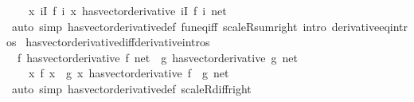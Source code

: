 \begin{isabellebody}
\ \ \ \ {\isacharparenleft}{\kern0pt}{\isacharparenleft}{\kern0pt}{\isasymlambda}x{\isachardot}{\kern0pt}\ {\isasymSum}i{\isasymin}I{\isachardot}{\kern0pt}\ f\ i\ x{\isacharparenright}{\kern0pt}\ has{\isacharunderscore}{\kern0pt}vector{\isacharunderscore}{\kern0pt}derivative\ {\isacharparenleft}{\kern0pt}{\isasymSum}i{\isasymin}I{\isachardot}{\kern0pt}\ f{\isacharprime}{\kern0pt}\ i{\isacharparenright}{\kern0pt}{\isacharparenright}{\kern0pt}\ net{\isachardoublequoteclose}\isanewline
%
\isadelimproof
\ \ %
\endisadelimproof
%
\isatagproof
{}\isamarkupfalse%
\ {\isacharparenleft}{\kern0pt}auto\ simp{\isacharcolon}{\kern0pt}\ has{\isacharunderscore}{\kern0pt}vector{\isacharunderscore}{\kern0pt}derivative{\isacharunderscore}{\kern0pt}def\ fun{\isacharunderscore}{\kern0pt}eq{\isacharunderscore}{\kern0pt}iff\ scaleR{\isacharunderscore}{\kern0pt}sum{\isacharunderscore}{\kern0pt}right\ intro{\isacharbang}{\kern0pt}{\isacharcolon}{\kern0pt}\ derivative{\isacharunderscore}{\kern0pt}eq{\isacharunderscore}{\kern0pt}intros{\isacharparenright}{\kern0pt}%
\endisatagproof
{\isafoldproof}%
%
\isadelimproof
\isanewline
%
\endisadelimproof
\isanewline
{}\isamarkupfalse%
\ has{\isacharunderscore}{\kern0pt}vector{\isacharunderscore}{\kern0pt}derivative{\isacharunderscore}{\kern0pt}diff{\isacharbrackleft}{\kern0pt}derivative{\isacharunderscore}{\kern0pt}intros{\isacharbrackright}{\kern0pt}{\isacharcolon}{\kern0pt}\isanewline
\ \ {\isachardoublequoteopen}{\isacharparenleft}{\kern0pt}f\ has{\isacharunderscore}{\kern0pt}vector{\isacharunderscore}{\kern0pt}derivative\ f{\isacharprime}{\kern0pt}{\isacharparenright}{\kern0pt}\ net\ {\isasymLongrightarrow}\ {\isacharparenleft}{\kern0pt}g\ has{\isacharunderscore}{\kern0pt}vector{\isacharunderscore}{\kern0pt}derivative\ g{\isacharprime}{\kern0pt}{\isacharparenright}{\kern0pt}\ net\ {\isasymLongrightarrow}\isanewline
\ \ \ \ {\isacharparenleft}{\kern0pt}{\isacharparenleft}{\kern0pt}{\isasymlambda}x{\isachardot}{\kern0pt}\ f\ x\ {\isacharminus}{\kern0pt}\ g\ x{\isacharparenright}{\kern0pt}\ has{\isacharunderscore}{\kern0pt}vector{\isacharunderscore}{\kern0pt}derivative\ {\isacharparenleft}{\kern0pt}f{\isacharprime}{\kern0pt}\ {\isacharminus}{\kern0pt}\ g{\isacharprime}{\kern0pt}{\isacharparenright}{\kern0pt}{\isacharparenright}{\kern0pt}\ net{\isachardoublequoteclose}\isanewline
%
\isadelimproof
\ \ %
\endisadelimproof
%
\isatagproof
{}\isamarkupfalse%
\ {\isacharparenleft}{\kern0pt}auto\ simp{\isacharcolon}{\kern0pt}\ has{\isacharunderscore}{\kern0pt}vector{\isacharunderscore}{\kern0pt}derivative{\isacharunderscore}{\kern0pt}def\ scaleR{\isacharunderscore}{\kern0pt}diff{\isacharunderscore}{\kern0pt}right{\isacharparenright}{\kern0pt}%

\end{isabellebody}
